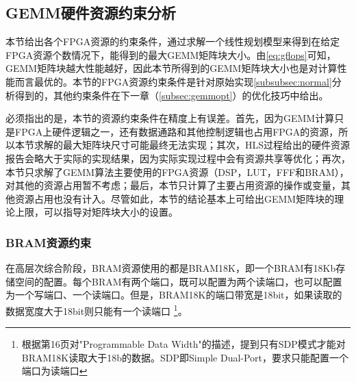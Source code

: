 \subsection{GEMM硬件资源约束分析}\label{subsec:resanalysis}

本节给出各个FPGA资源的约束条件，通过求解一个线性规划模型来得到在给定FPGA资源个数情况下，能得到的最大GEMM矩阵块大小。由\ref{eq:gflops}可知，GEMM矩阵块越大性能越好，因此本节所得到的GEMM矩阵块大小也是对计算性能而言最优的。本节的FPGA资源约束条件是针对原始实现\ref{subsubsec:normal}分析得到的，其他约束条件在下一章（\ref{subsec:gemmopt}）的优化技巧中给出。

必须指出的是，本节的资源约束条件在精度上有误差。首先，因为GEMM计算只是FPGA上硬件逻辑之一，还有数据通路和其他控制逻辑也占用FPGA的资源，所以本节求解的最大矩阵块尺寸可能最终无法实现；其次，HLS过程给出的硬件资源报告会略大于实际的实现结果，因为实际实现过程中会有资源共享等优化；再次，本节只求解了GEMM算法主要使用的FPGA资源（DSP，LUT，FFF和BRAM），对其他的资源占用暂不考虑；最后，本节只计算了主要占用资源的操作或变量，其他资源占用也没有计入。尽管如此，本节的结论基本上可给出GEMM矩阵块的理论上限，可以指导对矩阵块大小的设置。

\subsubsection{BRAM资源约束}
在高层次综合阶段，BRAM资源使用的都是BRAM18K，即一个BRAM有18Kb存储空间的配置。每个BRAM有两个端口，既可以配置为两个读端口，也可以配置为一个写端口、一个读端口。但是，BRAM18K的端口带宽是18bit，如果读取的数据宽度大于18bit则只能有一个读端口
\footnote{根据\cite{ds190}第16页对"Programmable Data Width"的描述，提到只有SDP模式才能对BRAM18K读取大于18b的数据。SDP即Simple Dual-Port，要求只能配置一个端口为读端口}。

